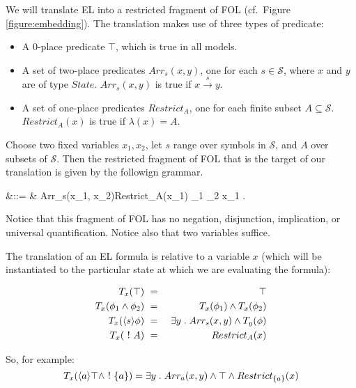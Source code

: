 

\NI We will translate EL into a restricted fragment of FOL  (cf.~Figure
\ref{figure:embedding}). The translation makes use of three types of
predicate:

\begin{itemize}

\item A 0-place predicate $\top$, which is true in all models.

\item A set of two-place predicates $Arr_s(x, y)$, one for each $s \in
  \mathcal{S}$, where $x$ and $y$ are of type $State$. $Arr_s(x, y)$
  is true if $x \xrightarrow{s} y$.

\item A set of one-place predicates $Restrict_A$, one for each finite
  subset $A \subseteq \mathcal{S}$.  $Restrict_{A}(x)$ is true if
  $\lambda(x) = A$.

\end{itemize}

\NI Choose two fixed variables $x_1, x_2$, let $s$ range over symbols
in $\mathcal{S}$, and $A$ over  subsets of
$\mathcal{S}$. Then the restricted fragment of FOL that is the target
of our translation is given by the followign grammar.

\begin{GRAMMAR}
  \phi 
     &\quad ::= \quad&
  \top \fOr Arr_{s}(x_1, x_2)\fOr Restrict_A(x_1) \fOr \phi_1 \AND \phi_2 \fOr \exists x_1 . \phi 
\end{GRAMMAR}

\NI Notice that this fragment of FOL has no negation, disjunction,
implication, or universal quantification. Notice also that two
variables suffice.

The translation of an EL formula is relative to a variable $x$ (which
will be instantiated to the particular state at which we are
evaluating the formula):

\begin{eqnarray*}
  T_x(\top) & \ = \ & \top  \\
  T_x(\phi_1 \land \phi_2) & \ = \ & T_x(\phi_1) \land T_x(\phi_2)  \\
  T_x(\langle s \rangle \phi) & \ = \ & \exists y \; . \; Arr_s(x,y) \land T_y(\phi)  \\
  T_x(\ ! \  A) & \ = \ & Restrict_A(x) 
\end{eqnarray*}

\NI So, for example:
\[
T_x(\langle a \rangle \top \land \ ! \  \{a\}) = \exists y \; . \; Arr_a(x,y) \land \top \land Restrict_{\{a\}}(x)
\]


